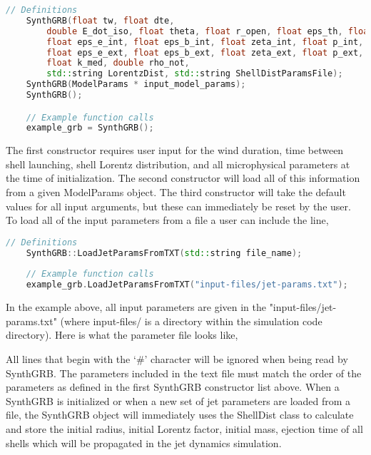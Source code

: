 \documentclass[linenumbers]{aastex631}
\begin{document}
\begin{lstlisting}[language = C++, caption = SynthGRB Constructors, label={lst: SynthGRB constructor}]
    // Definitions
    SynthGRB(float tw, float dte, 
        double E_dot_iso, float theta, float r_open, float eps_th, float sigma,
        float eps_e_int, float eps_b_int, float zeta_int, float p_int,
        float eps_e_ext, float eps_b_ext, float zeta_ext, float p_ext,
        float k_med, double rho_not,
        std::string LorentzDist, std::string ShellDistParamsFile);
    SynthGRB(ModelParams * input_model_params);
    SynthGRB();

    // Example function calls
    example_grb = SynthGRB();
\end{lstlisting}

The first constructor requires user input for the wind duration, time between shell launching, shell Lorentz distribution, and all microphysical parameters at the time of initialization. The second constructor will load all of this information from a given ModelParams object. The third constructor will take the default values for all input arguments, but these can immediately be reset by the user. To load all of the input parameters from a file a user can include the line,

\begin{lstlisting}[language = C++, caption = Loading Jet Parameters from a Given Text File, label={lst: LoadJetParamsFromTXT}]
    // Definitions
    SynthGRB::LoadJetParamsFromTXT(std::string file_name);
    
    // Example function calls
    example_grb.LoadJetParamsFromTXT("input-files/jet-params.txt");
\end{lstlisting}

In the example above, all input parameters are given in the "input-files/jet-params.txt" (where input-files/ is a directory within the simulation code directory). Here is what the parameter file looks like,



All lines that begin with the `$\#$' character will be ignored when being read by SynthGRB. The parameters included in the text file must match the order of the parameters as defined in the first SynthGRB constructor list above. When a SynthGRB is initialized or when a new set of jet parameters are loaded from a file, the SynthGRB object will immediately uses the ShellDist class to calculate and store the initial radius, initial Lorentz factor, initial mass, ejection time of all shells which will be propagated in the jet dynamics simulation. 
\end{document}
